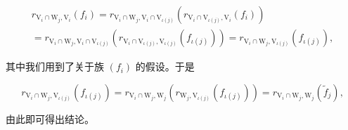 \[
\begin{array}{c} r _ {\mathrm{V} _ {i} \cap \mathrm{W} _ {j}, \mathrm{V} _ {i}} (f _ {i}) = r _ {\mathrm{V} _ {i} \cap \mathrm{W} _ {j}, \mathrm{V} _ {i} \cap \mathrm{V} _ {\iota (j)}} (r _ {\mathrm{V} _ {i} \cap \mathrm{V} _ {\iota (j)}, \mathrm{V} _ {i}} (f _ {i})) \\ = r _ {\mathrm{V} _ {i} \cap \mathrm{W} _ {j}, \mathrm{V} _ {i} \cap \mathrm{V} _ {\iota (j)}} (r _ {\mathrm{V} _ {i} \cap \mathrm{V} _ {\iota (j)}, \mathrm{V} _ {\iota (j)}} (f _ {\iota (j)})) = r _ {\mathrm{V} _ {i} \cap \mathrm{W} _ {j}, \mathrm{V} _ {\iota (j)}} (f _ {\iota (j)}), \end{array}
\]

其中我们用到了关于族 \((f_{i})\) 的假设。于是

\[
r _ {\mathrm{V} _ {i} \cap \mathrm{W} _ {j}, \mathrm{V} _ {\iota (j)}} (f _ {\iota (j)}) = r _ {\mathrm{V} _ {i} \cap \mathrm{W} _ {j}, \mathrm{W} _ {j}} (r _ {\mathrm{W} _ {j}, \mathrm{V} _ {\iota (j)}} (f _ {\iota (j)})) = r _ {\mathrm{V} _ {i} \cap \mathrm{W} _ {j}, \mathrm{W} _ {j}} (\widetilde {f} _ {j}),
\]

由此即可得出结论。

